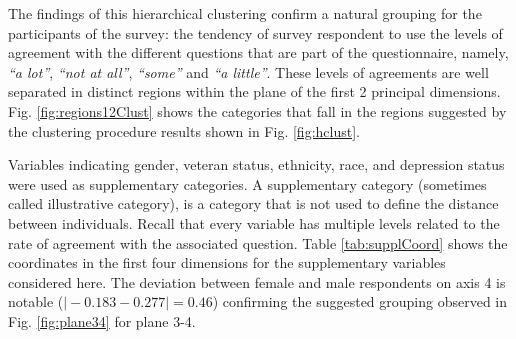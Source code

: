 \documentclass[conference]{IEEEtran}
\begin{document}







The findings of this hierarchical clustering confirm a natural grouping
for the participants of the survey: the tendency of survey respondent to
use the levels of agreement with the different questions that are part
of the questionnaire, namely, \emph{``a lot''}, \emph{``not at all''},
\emph{``some''} and \emph{``a little''}. These levels of agreements are
well separated in distinct regions within the plane of the first 2
principal dimensions. Fig. \ref{fig:regions12Clust} shows the categories
that fall in the regions suggested by the clustering procedure results
shown in Fig. \ref{fig:hclust}.

Variables indicating gender, veteran status, ethnicity, race, and
depression status were used as supplementary categories. A supplementary
category (sometimes called illustrative category), is a category that is
not used to define the distance between individuals. Recall that every
variable has multiple levels related to the rate of agreement with the
associated question. Table \ref{tab:supplCoord} shows the coordinates in
the first four dimensions for the supplementary variables considered
here. The deviation between female and male respondents on axis 4 is
notable (\(\vert -0.183 - 0.277 \vert = 0.46\)) confirming the suggested
grouping observed in Fig. \ref{fig:plane34} for plane 3-4.
\end{document}

